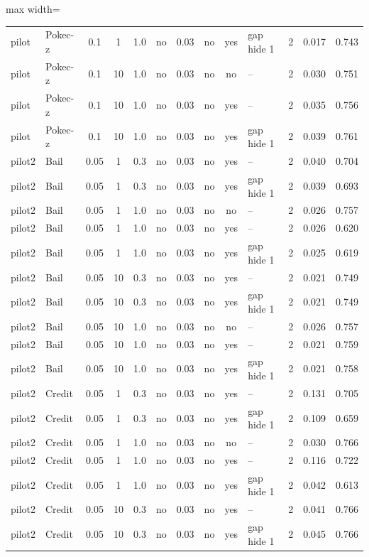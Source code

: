 \begin{table}[tbp]
\begin{adjustbox}{max width=\textwidth}
\begin{tabular}{llccccccclccc}
pilot & Pokec-z & 0.1 & 1 & 1.0 & no & 0.03 & no & yes & gap hide 1 & 2 & 0.017 & 0.743 \\
pilot & Pokec-z & 0.1 & 10 & 1.0 & no & 0.03 & no & no & -- & 2 & 0.030 & 0.751 \\
pilot & Pokec-z & 0.1 & 10 & 1.0 & no & 0.03 & no & yes & -- & 2 & 0.035 & 0.756 \\
pilot & Pokec-z & 0.1 & 10 & 1.0 & no & 0.03 & no & yes & gap hide 1 & 2 & 0.039 & 0.761 \\
pilot2 & Bail & 0.05 & 1 & 0.3 & no & 0.03 & no & yes & -- & 2 & 0.040 & 0.704 \\
pilot2 & Bail & 0.05 & 1 & 0.3 & no & 0.03 & no & yes & gap hide 1 & 2 & 0.039 & 0.693 \\
pilot2 & Bail & 0.05 & 1 & 1.0 & no & 0.03 & no & no & -- & 2 & 0.026 & 0.757 \\
pilot2 & Bail & 0.05 & 1 & 1.0 & no & 0.03 & no & yes & -- & 2 & 0.026 & 0.620 \\
pilot2 & Bail & 0.05 & 1 & 1.0 & no & 0.03 & no & yes & gap hide 1 & 2 & 0.025 & 0.619 \\
pilot2 & Bail & 0.05 & 10 & 0.3 & no & 0.03 & no & yes & -- & 2 & 0.021 & 0.749 \\
pilot2 & Bail & 0.05 & 10 & 0.3 & no & 0.03 & no & yes & gap hide 1 & 2 & 0.021 & 0.749 \\
pilot2 & Bail & 0.05 & 10 & 1.0 & no & 0.03 & no & no & -- & 2 & 0.026 & 0.757 \\
pilot2 & Bail & 0.05 & 10 & 1.0 & no & 0.03 & no & yes & -- & 2 & 0.021 & 0.759 \\
pilot2 & Bail & 0.05 & 10 & 1.0 & no & 0.03 & no & yes & gap hide 1 & 2 & 0.021 & 0.758 \\
pilot2 & Credit & 0.05 & 1 & 0.3 & no & 0.03 & no & yes & -- & 2 & 0.131 & 0.705 \\
pilot2 & Credit & 0.05 & 1 & 0.3 & no & 0.03 & no & yes & gap hide 1 & 2 & 0.109 & 0.659 \\
pilot2 & Credit & 0.05 & 1 & 1.0 & no & 0.03 & no & no & -- & 2 & 0.030 & 0.766 \\
pilot2 & Credit & 0.05 & 1 & 1.0 & no & 0.03 & no & yes & -- & 2 & 0.116 & 0.722 \\
pilot2 & Credit & 0.05 & 1 & 1.0 & no & 0.03 & no & yes & gap hide 1 & 2 & 0.042 & 0.613 \\
pilot2 & Credit & 0.05 & 10 & 0.3 & no & 0.03 & no & yes & -- & 2 & 0.041 & 0.766 \\
pilot2 & Credit & 0.05 & 10 & 0.3 & no & 0.03 & no & yes & gap hide 1 & 2 & 0.045 & 0.766 \\

\end{tabular}
\end{adjustbox}
\end{table}
